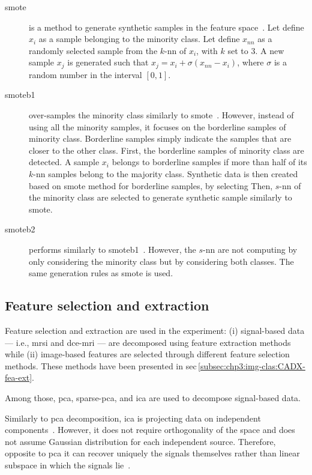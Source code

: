 \begin{description}
\item[\Ac{smote}] is a method to generate synthetic samples in the feature space~\cite{chawla2002smote}.
Let define $x_i$ as a sample belonging to the minority class.
Let define $x_{nn}$ as a randomly selected sample from the $k$-\ac{nn} of $x_i$, with $k$ set to 3.
A new sample $x_j$ is generated such that $x_j = x_i + \sigma \left( x_{nn} - x_i \right)$, where $\sigma$ is a random number in the interval $\left[0,1\right]$.
\item[\Ac{smoteb1}] over-samples the minority class similarly to \ac{smote}~\cite{han2005borderline}.
However, instead of using all the minority samples, it focuses on the borderline samples of minority class.
Borderline samples simply indicate the samples that are closer to the other class.
First, the borderline samples of minority class are detected.
A sample $x_{i}$ belongs to borderline samples if more than half of its $k$-\ac{nn} samples belong to the majority class.
Synthetic data is then created based on \ac{smote} method for borderline samples, by selecting 
Then, $s$-\ac{nn} of the minority class are selected to generate synthetic sample similarly to \ac{smote}.
 
\item[\Ac{smoteb2}] performs similarly to \ac{smoteb1}~\cite{han2005borderline}.
However, the $s$-\ac{nn} are not computing by only considering the minority class but by considering both classes.
The same generation rules as \ac{smote} is used.
\end{description}

\subsection{Feature selection and extraction}\label{subsec:chp6:method:fea-sel}


Feature selection and extraction are used in the experiment: (i) signal-based data --- i.e., \ac{mrsi} and \ac{dce}-\ac{mri} --- are decomposed using feature extraction methods while (ii) image-based features are selected through different feature selection methods.
These methods have been presented in \acs{sec}\,\ref{subsec:chp3:img-clas:CADX-fea-ext}.

Among those, \ac{pca}, sparse-\ac{pca}, and \ac{ica} are used to decompose signal-based data.

Similarly to \ac{pca} decomposition, \ac{ica} is projecting data on independent components~\cite{comon1994independent}.
However, it does not require orthogonality of the space and does not assume Gaussian distribution for each independent source.
Therefore, opposite to \ac{pca} it can recover uniquely the signals themselves rather than linear subspace in which the signals lie~\cite{murphy2012machine}.

